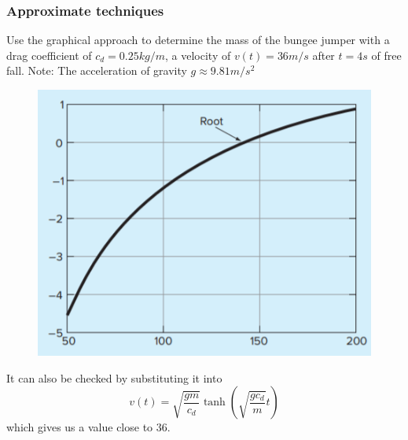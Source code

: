 \documentclass{if-beamer}
\begin{document}
\begin{frame}
\frametitle{Approximate techniques}
Use the graphical approach to determine the mass of the bungee jumper with a drag coefficient of $c_d = 0.25 kg/m$, a velocity of $v(t)=36 m/s$ after $t = 4 s$ of free fall. Note: The acceleration of gravity $g \approx 9.81 m/s^2$ \\
\vspace{5pt}
\begin{minipage}{0.5\textwidth}
	\begin{figure}
		\centering
		\includegraphics[width = \textwidth]{figures/BunjeeJumpGraph}
	\end{figure}
\end{minipage}
\begin{minipage}{0.5\textwidth}
	It can also be checked by substituting it into
	$$v(t) = \sqrt{\frac{gm}{c_d}}\tanh\left(\sqrt{\frac{gc_d}{m}}t\right)$$
	which gives us a value close to 36.
\end{minipage}

\end{frame}
\end{document}
